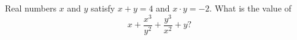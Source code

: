 Real numbers $x$ and $y$ satisfy $x+y=4$ and $x\cdot y=-2$. What is the value of
\[x+\dfrac{x^3}{y^2}+\dfrac{y^3}{x^2}+y?\]
